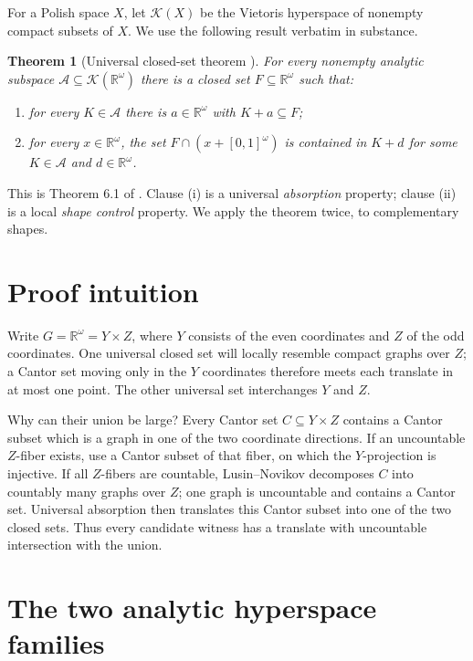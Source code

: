 \documentclass[11pt]{article}
\newtheorem{theorem}{Theorem}
\newcommand{\R}{\mathbb R}
\newcommand{\K}{\mathcal K}
\newcommand{\cA}{\mathscr A}
\begin{document}
For a Polish space $X$, let $\K(X)$ be the Vietoris hyperspace of nonempty
compact subsets of $X$.  We use the following result verbatim in substance.

\begin{theorem}[Universal closed-set theorem \cite{banakh-et-al}]
\label{thm:universal}
For every nonempty analytic subspace $\cA\subseteq\K(\R^\omega)$ there is a
closed set $F\subseteq\R^\omega$ such that:
\begin{enumerate}[label=(\roman*)]
\item for every $K\in\cA$ there is $a\in\R^\omega$ with $K+a\subseteq F$;
\item for every $x\in\R^\omega$, the set
$F\cap(x+[0,1]^\omega)$ is contained in $K+d$ for some $K\in\cA$ and
$d\in\R^\omega$.
\end{enumerate}
\end{theorem}

This is Theorem 6.1 of \cite{banakh-et-al}.  Clause (i) is a universal
\emph{absorption} property; clause (ii) is a local \emph{shape control}
property.  We apply the theorem twice, to complementary shapes.

\section{Proof intuition}

Write $G=\R^\omega=Y\times Z$, where $Y$ consists of the even coordinates and
$Z$ of the odd coordinates.  One universal closed set will locally resemble
compact graphs over $Z$; a Cantor set moving only in the $Y$ coordinates
therefore meets each translate in at most one point.  The other universal set
interchanges $Y$ and $Z$.

Why can their union be large?  Every Cantor set $C\subseteq Y\times Z$
contains a Cantor subset which is a graph in one of the two coordinate
directions.  If an uncountable $Z$-fiber exists, use a Cantor subset of that
fiber, on which the $Y$-projection is injective.  If all $Z$-fibers are
countable, Lusin--Novikov decomposes $C$ into countably many graphs over $Z$;
one graph is uncountable and contains a Cantor set.  Universal absorption then
translates this Cantor subset into one of the two closed sets.  Thus every
candidate witness has a translate with uncountable intersection with the
union.

\section{The two analytic hyperspace families}
\end{document}
